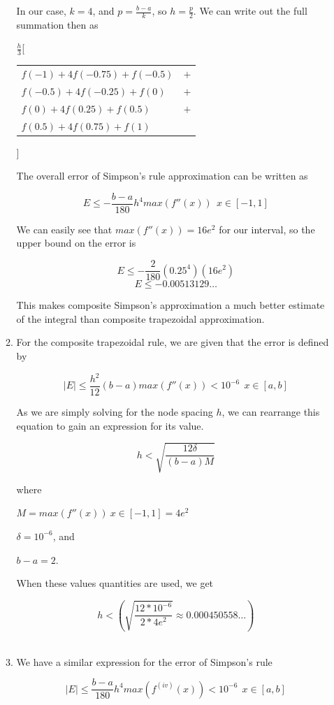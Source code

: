 \documentclass[11pt]{article}
\begin{document}
\begin{enumerate}
\begin{enumerate}
		In our case, $k = 4$, and $p = \frac{b-a}{k}$, so $h = \frac{p}{2}$. We can write out the full summation then as

		\medskip

		$\frac{h}{3}$[
		\begin{tabular}{ll}
			$f(-1) + 4f(-0.75) + f(-0.5)$ & $+$ \\
			$f(-0.5) + 4f(-0.25) + f(0)$ & $+$ \\
			$f(0) + 4f(0.25) + f(0.5)$ & $+$ \\
			$f(0.5) + 4f(0.75) + f(1)$
		\end{tabular}
		]

		\medskip

		The overall error of Simpson's rule approximation can be written as

		\[
		E \leq -\frac{b-a}{180}h^4max(f''(x))\ \ x\in[-1,1]
		\]

		We can easily see that $max(f''(x)) = 16e^2$ for our interval, so the upper bound on the error is

		\[
		E \leq -\frac{2}{180}(0.25^4)(16e^2)
		\]
		\[
		E \leq -0.00513129\ldots
		\]

		This makes composite Simpson's approximation a much better estimate of the integral than composite trapezoidal approximation.

		\medskip

		\item For the composite trapezoidal rule, we are given that the error is defined by

		\[
		|E| \leq \frac{h^2}{12} (b-a) max(f''(x)) < 10^{-6}\ \ x\in[a,b]
		\]

		As we are simply solving for the node spacing $h$, we can rearrange this equation to gain an expression for its value.

		\[
		h  < \sqrt{\frac{12\delta}{(b-a)M}}
		\]

		where

		$M=max(f''(x))\ x\in[-1,1] = 4e^2$

		$\delta=10^{-6}$, and

		$b-a=2$.

		When these values quantities are used, we get

		\[
		h < (\sqrt{\frac{12*10^{-6}}{2*4e^2}} \approx 0.000450558\ldots)
		\] \

		\item We have a similar expression for the error of Simpson's rule

		\[
		|E| \leq \frac{b-a}{180}h^4max(f^{(iv)}(x)) < 10^{-6}\ \ x\in[a,b]
		\]


\end{enumerate}
\end{enumerate}
\end{document}
